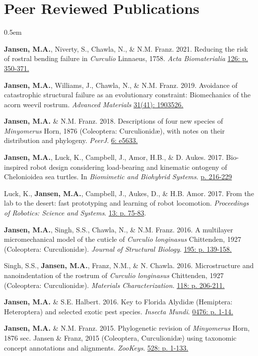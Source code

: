 \documentclass[12pt,a4paper]{article}
\begin{document}
\section*{Peer Reviewed Publications}
	\begin{description}
		\itemsep0.5em
		\item \textbf{Jansen, M.A.}, Niverty, S., Chawla, N., \& N.M. Franz. 2021. Reducing the risk of rostral bending failure in \textit{Curculio} Linnaeus, 1758. \textit{Acta Biomaterialia} \href{https://doi.org/10.1016/j.actbio.2021.03.029}{126: p. 350-371.}
		\item \textbf{Jansen, M.A.}, Williams, J., Chawla, N., \& N.M. Franz. 2019. Avoidance of catastrophic structural failure as an evolutionary constraint: Biomechanics of the acorn weevil rostrum. \textit{Advanced Materials} \href{https://doi.org/10.1002/adma.201903526}{31(41): 1903526.}
		\item \textbf{Jansen, M.A.} \& N.M. Franz. 2018. Descriptions of four new species of \textit{Minyomerus} Horn, 1876 (Coleoptera: Curculionid\ae), with notes on their distribution and phylogeny. \textit{PeerJ}. \href{https://peerj.com/articles/5633/}{6: e5633.}
		\item \textbf{Jansen, M.A.}, Luck, K., Campbell, J., Amor, H.B., \& D. Aukes. 2017. Bio-inspired robot design considering load-bearing and kinematic ontogeny of Chelonioidea sea turtles. In \textit{Biomimetic and Biohybrid Systems}. \href{http://www.springer.com/us/book/9783319635361}{p. 216-229}
		\item Luck, K., \textbf{Jansen, M.A.}, Campbell, J., Aukes, D., \& H.B. Amor. 2017. From the lab to the desert: fast prototyping and learning of robot locomotion. \textit{Proceedings of Robotics: Science and Systems}. \href{http://www.roboticsproceedings.org/rss13/p75.html}{13: p. 75-83}.
		\item \textbf{Jansen, M.A.}, Singh, S.S., Chawla, N., \& N.M. Franz. 2016. A multilayer micromechanical model of the cuticle of \textit{Curculio longinasus} Chittenden, 1927 (Coleoptera: Curculionid\ae). \textit{Journal of Structural Biology}. \href{http://www.sciencedirect.com/science/article/pii/S1047847716300922}{195: p. 139-158.}
		\item Singh, S.S., \textbf{Jansen, M.A.}, Franz, N.M., \& N. Chawla. 2016. Microstructure and nanoindentation of the rostrum of \textit{Curculio longinasus} Chittenden, 1927 (Coleoptera: Curculionid\ae). \textit{Materials Characterization}. \href{http://www.sciencedirect.com/science/article/pii/S1044580316301619}{118: p. 206-211.}
		\item \textbf{Jansen, M.A.} \& S.E. Halbert. 2016. Key to Florida Alydid{\ae} (Hemiptera: Heteroptera) and selected exotic pest species. \textit{Insecta Mundi}. \href{http://journals.fcla.edu/mundi/article/view/87952/84644}{0476: p. 1-14.}
		\item \textbf{Jansen, M.A.} \& N.M. Franz. 2015. Phylogenetic revision of \textit{Minyomerus} Horn, 1876 sec. Jansen \& Franz, 2015 (Coleoptera, Curculionid\ae) using taxonomic concept annotations and alignments. \textit{ZooKeys}. \href{http://zookeys.pensoft.net/articles.php?id=6001}{528: p. 1-133.}
	\end{description}
	
\end{document}
